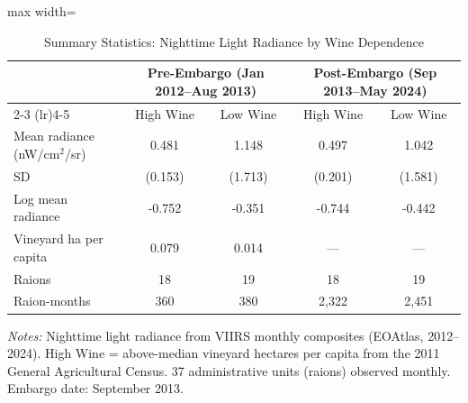 \begin{table}[t]
\centering
\caption{Summary Statistics: Nighttime Light Radiance by Wine Dependence}
\label{tab:sumstats}
\begin{adjustbox}{max width=\textwidth}
\begin{tabular}{lcccc}
\hline\hline
 & \multicolumn{2}{c}{Pre-Embargo (Jan 2012--Aug 2013)} & \multicolumn{2}{c}{Post-Embargo (Sep 2013--May 2024)} \\
\cmidrule(lr){2-3} \cmidrule(lr){4-5}
 & High Wine & Low Wine & High Wine & Low Wine \\
\hline
Mean radiance (nW/cm$^2$/sr) & 0.481 & 1.148 & 0.497 & 1.042 \\
SD & (0.153) & (1.713) & (0.201) & (1.581) \\
Log mean radiance & -0.752 & -0.351 & -0.744 & -0.442 \\
Vineyard ha per capita & 0.079 & 0.014 & --- & --- \\
Raions & 18 & 19 & 18 & 19 \\
Raion-months & 360 & 380 & 2,322 & 2,451 \\
\hline\hline
\end{tabular}
\end{adjustbox}
\begin{tablenotes}
\item \textit{Notes:} Nighttime light radiance from VIIRS monthly composites (EOAtlas, 2012--2024).
High Wine = above-median vineyard hectares per capita from the 2011 General Agricultural Census.
37 administrative units (raions) observed monthly. Embargo date: September 2013.
\end{tablenotes}
\end{table}
